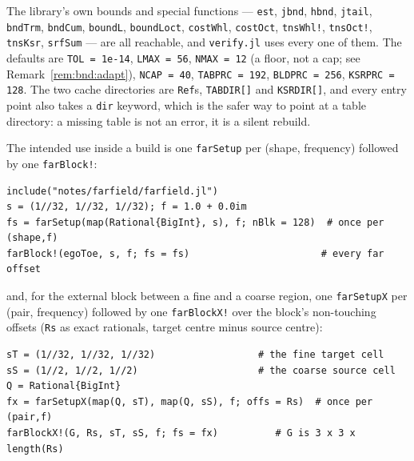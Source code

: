 \documentclass[11pt]{article}
\theoremstyle{remark}
\newcommand{\code}[1]{\texttt{#1}}
\begin{document}
\noindent
The library's own bounds and special functions --- \code{est}, \code{jbnd}, \code{hbnd},
\code{jtail}, \code{bndTrm}, \code{bndCum}, \code{boundL}, \code{boundLoct},
\code{costWhl}, \code{costOct}, \code{tnsWhl!}, \code{tnsOct!}, \code{tnsKsr},
\code{srfSum} --- are all reachable, and \code{verify.jl} uses every one of them. The
defaults are \code{TOL = 1e-14}, \code{LMAX = 56}, \code{NMAX = 12} (a floor, not a cap; see
Remark~\ref{rem:bnd:adapt}), \code{NCAP = 40}, \code{TABPRC = 192},
\code{BLDPRC = 256}, \code{KSRPRC = 128}. The two cache directories are
\code{Ref}s, \code{TABDIR[]} and \code{KSRDIR[]}, and every entry point also takes a
\code{dir} keyword, which is the safer way to point at a table directory: a missing table is
not an error, it is a silent rebuild.

The intended use inside a build is one \code{farSetup} per (shape, frequency) followed by
one \code{farBlock!}:

\begin{center}\small
\begin{minipage}{0.86\textwidth}
\begin{verbatim}
include("notes/farfield/farfield.jl")
s = (1//32, 1//32, 1//32); f = 1.0 + 0.0im
fs = farSetup(map(Rational{BigInt}, s), f; nBlk = 128)  # once per (shape,f)
farBlock!(egoToe, s, f; fs = fs)                       # every far offset
\end{verbatim}
\end{minipage}
\end{center}

\noindent
and, for the external block between a fine and a coarse region, one \code{farSetupX}
per (pair, frequency) followed by one \code{farBlockX!} over the block's non-touching
offsets (\code{Rs} as exact rationals, target centre minus source centre):

\begin{center}\small
\begin{minipage}{0.86\textwidth}
\begin{verbatim}
sT = (1//32, 1//32, 1//32)                  # the fine target cell
sS = (1//2, 1//2, 1//2)                     # the coarse source cell
Q = Rational{BigInt}
fx = farSetupX(map(Q, sT), map(Q, sS), f; offs = Rs)  # once per (pair,f)
farBlockX!(G, Rs, sT, sS, f; fs = fx)          # G is 3 x 3 x length(Rs)
\end{verbatim}
\end{minipage}
\end{center}
\end{document}
